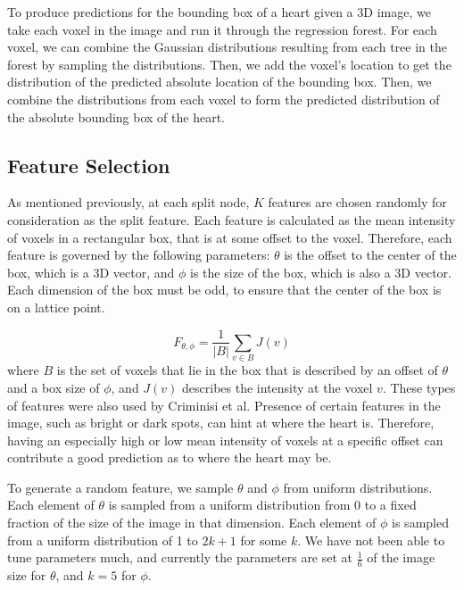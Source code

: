 To produce predictions for the bounding box of a heart given a 3D image, we take each voxel in the image and run it through the regression forest. For each voxel, we can combine the Gaussian distributions resulting from each tree in the forest by sampling the distributions. Then, we add the voxel's location to get the distribution of the predicted absolute location of the bounding box. Then, we combine the distributions from each voxel to form the predicted distribution of the absolute bounding box of the heart.


\subsection{Feature Selection}
As mentioned previously, at each split node, $K$ features are chosen randomly for consideration as the split feature. Each feature is calculated as the mean intensity of voxels in a rectangular box, that is at some offset to the voxel. Therefore, each feature is governed by the following parameters: $\theta$ is the offset to the center of the box, which is a 3D vector, and $\phi$ is the size of the box, which is also a 3D vector. Each dimension of the box must be odd, to ensure that the center of the box is on a lattice point.

\begin{equation}
  F_{\theta, \phi} = \frac{1}{|B|} \sum_{v \in B} J(v)
\end{equation}
where $B$ is the set of voxels that lie in the box that is described by an offset of $\theta$ and a box size of $\phi$, and $J(v)$ describes the intensity at the voxel $v$. These types of features were also used by Criminisi et al. Presence of certain features in the image, such as bright or dark spots, can hint at where the heart is. Therefore, having an especially high or low mean intensity of voxels at a specific offset can contribute a good prediction as to where the heart may be.

To generate a random feature, we sample $\theta$ and $\phi$ from uniform distributions. Each element of $\theta$ is sampled from a uniform distribution from 0 to a fixed fraction of the size of the image in that dimension. Each element of $\phi$ is sampled from a uniform distribution of 1 to $2k+1$ for some $k$. We have not been able to tune parameters much, and currently the parameters are set at $\frac{1}{6}$ of the image size for $\theta$, and $k = 5$ for $\phi$. 

